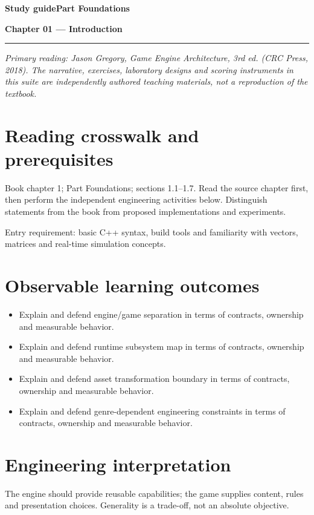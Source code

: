 \documentclass[11pt,letterpaper]{article}
\newcommand{\DocType}{Reference}
\newcommand{\SuiteHeading}[3]{%
\renewcommand{\DocType}{#2}%
{\small\bfseries\sffamily\color{EngineTeal}#2\hfill #3}\par\vspace{6pt}
{\LARGE\bfseries\color{EngineBlue}#1}\par\vspace{4pt}
{\color{EngineTeal}\rule{\linewidth}{1pt}}\par\vspace{7pt}}
\newcommand{\SourceNote}{\footnotesize\textit{Primary reading: Jason Gregory, \emph{Game Engine Architecture}, 3rd ed. (CRC Press, 2018). The narrative, exercises, laboratory designs and scoring instruments in this suite are independently authored teaching materials, not a reproduction of the textbook.}\normalsize\par}
\begin{document}
\SuiteHeading{Chapter 01 — Introduction}{Study guide}{Part Foundations}
\SourceNote
\section{Reading crosswalk and prerequisites}
Book chapter 1; Part Foundations; sections 1.1--1.7. Read the source chapter first, then perform the independent engineering activities below. Distinguish statements from the book from proposed implementations and experiments.

Entry requirement: basic C++ syntax, build tools and familiarity with vectors, matrices and real-time simulation concepts.

\section{Observable learning outcomes}
\begin{itemize}
\item Explain and defend engine/game separation in terms of contracts, ownership and measurable behavior.
\item Explain and defend runtime subsystem map in terms of contracts, ownership and measurable behavior.
\item Explain and defend asset transformation boundary in terms of contracts, ownership and measurable behavior.
\item Explain and defend genre-dependent engineering constraints in terms of contracts, ownership and measurable behavior.
\end{itemize}
\section{Engineering interpretation}
The engine should provide reusable capabilities; the game supplies content, rules and presentation choices. Generality is a trade-off, not an absolute objective.
\end{document}
